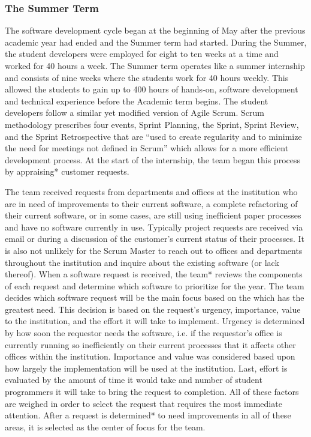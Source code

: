 \subsubsection{The Summer Term}
The software development cycle began at the beginning of May after the previous academic year had ended and the Summer term had started. During the Summer, the student developers were employed for eight to ten weeks at a time and worked for 40 hours a week. The Summer term operates like a summer internship and consists of nine weeks where the students work for 40 hours weekly. This allowed the students to gain up to 400 hours of hands-on, software development and technical experience before the Academic term begins. The student developers follow a similar yet modified version of Agile Scrum. Scrum methodology prescribes four events, Sprint Planning, the Sprint, Sprint Review, and the Sprint Retrospective that are ``used to create regularity and to minimize the need for meetings not defined in Scrum'' which allows for a more efficient development process. At the start of the internship, the team began this process by appraising* customer requests.

The team received requests from departments and offices at the institution who are in need of improvements to their current software, a complete refactoring of their current software, or in some cases, are still using inefficient paper processes and have no software currently in use. Typically project requests are received via email or during a discussion of the customer's current status of their processes. It is also not unlikely for the Scrum Master to reach out to offices and departments throughout the institution and inquire about the existing software (or lack thereof).  When a software request is received, the team* reviews the components of each request and determine which software to prioritize for the year. The team decides which software request will be the main focus based on the which has the greatest need. This decision is based on the request's urgency, importance, value to the institution, and the effort it will take to implement. Urgency is determined by how soon the requestor needs the software, i.e. if the requestor's office is currently running so inefficiently on their current processes that it affects other offices within the institution. Importance and value was considered based upon how largely the implementation will be used at the institution. Last, effort is evaluated by the amount of time it would take and  number of student programmers it will take to bring the request to completion. All of these factors are weighed in order to select the request that requires the most immediate attention. After a request is determined* to need improvements in all of these areas, it is selected as the center of focus for the team.

